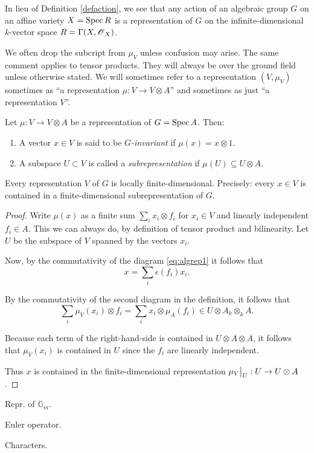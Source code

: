 \documentclass[11pt, norsk]{article}
\begin{document}
\begin{remark}
In lieu of Definition \ref{defaction}, we see that any action of an algebraic group $G$ on an affine variety $X=\operatorname{Spec} R$ is a representation of $G$ on the infinite-dimensional $k$-vector space $R=\Gamma(X,\operatorname{\mathscr{O}}_X)$.
\end{remark}

We often drop the subcript from $\mu_V$ unless confusion may arise. The same comment applies to tensor products. They will always be over the ground field unless otherwise stated. We will sometimes refer to a representation $(V,\mu_V)$ sometimes as ``a representation $\mu:V \to V \otimes A$'' and sometimes as just ``a representation $V$''.

\begin{defi}
Let $\mu:V \to V \otimes A$ be a representation of $G = \operatorname{Spec} A$. Then:
\begin{enumerate}
\item A vector $x \in V$ is said to be \emph{$G$-invariant} if $\mu(x) = x \otimes 1$.
\item A subspace $U \subset V$ is called a \emph{subrepresentation} if $\mu(U) \subseteq U \otimes A$. 
\end{enumerate}
\end{defi}

\begin{prop}
Every representation $V$ of $G$ is locally finite-dimensional. Precisely: every $x \in V$ is contained in a finite-dimensional subrepresentation of $G$.
\end{prop}

\begin{proof}
Write $\mu(x)$ as a finite sum $\sum_i x_i \otimes f_i$ for $x_i \in V$ and linearly independent $f_i \in A$. This we can always do, by definition of tensor product and bilinearity. Let $U$ be the subspace of $V$ spanned by the vectors $x_i$. 

Now, by the commutativity of the diagram \eqref{eq:algrep1} it follows that $$ x = \sum_i \epsilon(f_i) x_i. $$

By the commutativity of the second diagram in the definition, it follows that
$$
\sum_i \mu_V (x_i) \otimes f_i = \sum_i x_i \otimes \mu_A(f_i) \in U \otimes A_k \otimes_k A.
$$

Because each term of the right-hand-side is contained in $U \otimes A \otimes A$, it follows that $\mu_V(x_i)$ is contained in $U$ since the $f_i$ are linearly independent.

Thus $x$ is contained in the finite-dimensional representation $\restr{\mu_V}{U}:U \to U \otimes A$.
\end{proof}

Repr. of $\mathbb G_m$.

Euler operator.

Characters.
\end{document}
